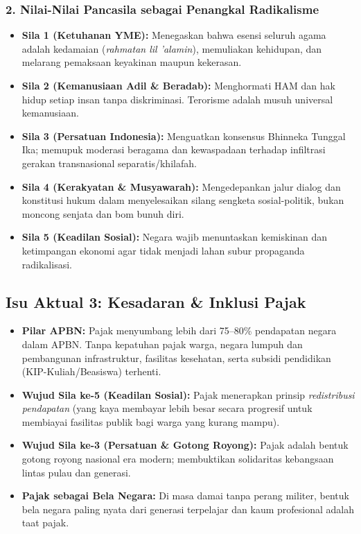 \documentclass[10pt,a4paper]{article}
\begin{document}
\subsubsection{2. Nilai-Nilai Pancasila sebagai Penangkal Radikalisme}
\begin{itemize}
  \item \textbf{Sila 1 (Ketuhanan YME):} Menegaskan bahwa esensi seluruh agama adalah kedamaian (\textit{rahmatan lil 'alamin}), memuliakan kehidupan, dan melarang pemaksaan keyakinan maupun kekerasan.
  \item \textbf{Sila 2 (Kemanusiaan Adil \& Beradab):} Menghormati HAM dan hak hidup setiap insan tanpa diskriminasi. Terorisme adalah musuh universal kemanusiaan.
  \item \textbf{Sila 3 (Persatuan Indonesia):} Menguatkan konsensus Bhinneka Tunggal Ika; memupuk moderasi beragama dan kewaspadaan terhadap infiltrasi gerakan transnasional separatis/khilafah.
  \item \textbf{Sila 4 (Kerakyatan \& Musyawarah):} Mengedepankan jalur dialog dan konstitusi hukum dalam menyelesaikan silang sengketa sosial-politik, bukan moncong senjata dan bom bunuh diri.
  \item \textbf{Sila 5 (Keadilan Sosial):} Negara wajib menuntaskan kemiskinan dan ketimpangan ekonomi agar tidak menjadi lahan subur propaganda radikalisasi.
\end{itemize}

\subsection{Isu Aktual 3: Kesadaran \& Inklusi Pajak}
\begin{casebox}
\begin{itemize}
  \item \textbf{Pilar APBN:} Pajak menyumbang lebih dari 75--80\% pendapatan negara dalam APBN. Tanpa kepatuhan pajak warga, negara lumpuh dan pembangunan infrastruktur, fasilitas kesehatan, serta subsidi pendidikan (KIP-Kuliah/Beasiswa) terhenti.
  \item \textbf{Wujud Sila ke-5 (Keadilan Sosial):} Pajak menerapkan prinsip \textit{redistribusi pendapatan} (yang kaya membayar lebih besar secara progresif untuk membiayai fasilitas publik bagi warga yang kurang mampu).
  \item \textbf{Wujud Sila ke-3 (Persatuan \& Gotong Royong):} Pajak adalah bentuk gotong royong nasional era modern; membuktikan solidaritas kebangsaan lintas pulau dan generasi.
  \item \textbf{Pajak sebagai Bela Negara:} Di masa damai tanpa perang militer, bentuk bela negara paling nyata dari generasi terpelajar dan kaum profesional adalah taat pajak.
\end{itemize}
\end{casebox}
\end{document}
